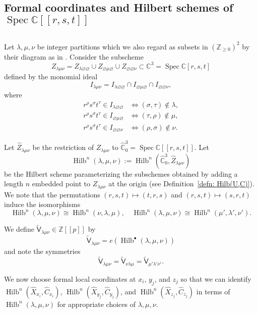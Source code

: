 \documentclass[12pt]{amsart}
\theoremstyle{definition}
\newcommand{\CC} {\mathbb{C}}          %
\newcommand{\ZZ} {\mathbb{Z}}		%
\newcommand{\sfVtilde}{\widetilde{\mathsf{V}}}
\newcommand{\Hilb}{\operatorname{Hilb}}
\newcommand{\Spec}{\operatorname{Spec}}
\renewcommand{\emptyset}{\varnothing}
\renewcommand{\hat}{\widehat}
\newcommand{\Xhat}{\widehat{X}}
\newcommand{\SubSecSpace}{$\,$\vspace{0.2cm}\par } %
\begin{document}
\subsection{Formal coordinates and Hilbert schemes
of $\Spec \CC [[r,s,t]]$}\label{subsec: Formal coordinates and
reduction to Hilbert scheme on C3}\SubSecSpace

Let $\lambda ,\mu ,\nu$ be integer partitions which we also regard as
subsets in $(\ZZ_{\geq 0})^{2}$ by their diagram as in
\cite{Bryan-Kool-Young}. Consider the subscheme
\[
Z_{\lambda \mu \nu}=Z_{\lambda \emptyset \emptyset}\cup
Z_{\emptyset \mu \emptyset}\cup Z_{\emptyset \emptyset \nu } \subset
\CC^{3}=\Spec \CC [r,s,t]
\]
defined by the monomial ideal
\[
I_{\lambda \mu \nu} = I_{\lambda \emptyset \emptyset}\cap I_{\emptyset \mu \emptyset}\cap I_{\emptyset \emptyset \nu},
\]
where 
\begin{align*}
r^{\rho}s^{\sigma}t^{\tau}\in I_{\lambda \emptyset \emptyset} & \iff
(\sigma ,\tau )\notin \lambda ,\\
r^{\rho}s^{\sigma}t^{\tau}\in I_{\emptyset \mu  \emptyset} & \iff
(\tau,\rho  )\notin \mu ,\\
r^{\rho}s^{\sigma}t^{\tau}\in I_{\emptyset \emptyset \nu } & \iff
(\rho ,\sigma  )\notin \nu . 
\end{align*}

Let $\hat{Z}_{\lambda \mu \nu}$ be the restriction of $Z_{\lambda \mu
\nu}$ to $\hat{\CC}^{3}_{0} = \Spec \CC [[r,s,t]]$. Let
\[
\Hilb^{n}(\lambda ,\mu ,\nu) := \Hilb^{n}(\hat{\CC}^{3}_{0}, \hat{Z}_{\lambda \mu \nu} )
\]
be the Hilbert scheme parameterizing the subschemes obtained by adding
a length $n$ embedded point to $Z_{\lambda \mu \nu}$ at the origin
(see Definition~\ref{defn: Hilb(U,C)}). We note that the permutations
$(r,s,t)\mapsto (t,r,s)$ and $(r,s,t)\mapsto (s,r,t)$ induce the
isomorphisms
\[
\Hilb^{n}(\lambda ,\mu ,\nu )\cong \Hilb^{n}(\nu,\lambda,\mu   ),\quad
\Hilb^{n}(\lambda ,\mu ,\nu )\cong \Hilb^{n}( \mu ',\lambda ',\nu ' ).
\]


We define $\sfVtilde_{\lambda
\mu \nu}\in \ZZ [[p]]$ by
\[
\sfVtilde_{\lambda \mu \nu} = e\left(\Hilb^{\bullet}(\lambda ,\mu ,\nu ) \right)
\]
and note the symmetries 
\[
\sfVtilde_{\lambda \mu \nu}=\sfVtilde_{ \nu \lambda \mu
}=\sfVtilde_{\mu '\lambda '\nu '}.
\]


We now choose formal local coordinates at $x_{i}$, $y_{j}$, and
$z_{j}$ so that we can identify
$\Hilb^{n}(\Xhat_{x_{i}},\hat{C}_{x_{i}})$,
$\Hilb^{n}(\Xhat_{y_{j}},\hat{C}_{y_{j}})$, and
$\Hilb^{n}(\Xhat_{z_{j}},\hat{C}_{z_{j}})$ in terms of
$\Hilb^{n}(\lambda ,\mu ,\nu )$ for appropriate choices of $\lambda
,\mu ,\nu$. 
\end{document}
